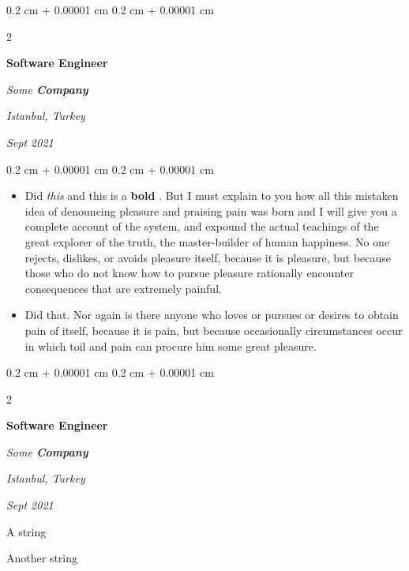 \documentclass[10pt, letterpaper]{article}
\newenvironment{summary}{
    \begin{description}[
        topsep=0.10 cm,
        parsep=0.10 cm,
        partopsep=0pt,
        itemsep=0pt,
        leftmargin=0.4 cm + 10pt
    ]
}{
    \end{description}
} %
\newenvironment{highlights}{
    \begin{itemize}[
        topsep=0.10 cm,
        parsep=0.10 cm,
        partopsep=0pt,
        itemsep=0pt,
        leftmargin=0.4 cm + 10pt
    ]
}{
    \end{itemize}
} %
\newenvironment{onecolentry}{
    \begin{adjustwidth}{
        0.2 cm + 0.00001 cm
    }{
        0.2 cm + 0.00001 cm
    }
}{
    \end{adjustwidth}
} %
\newenvironment{twocolentry}[2][]{
    \onecolentry
    \def\secondColumn{#2}
    \setcolumnwidth{\fill, 4.5 cm}
    \begin{paracol}{2}
}{
    \switchcolumn \raggedleft \secondColumn
    \end{paracol}
    \endonecolentry
} %
\let\hrefWithoutArrow\href
\renewcommand{\href}[2]{\hrefWithoutArrow{#1}{\ifthenelse{\equal{#2}{}}{ }{#2 }\raisebox{.15ex}{\footnotesize \faExternalLink*}}}
\begin{document}
        \vspace{0.2 cm}

        \begin{twocolentry}{
        \textit{Istanbul, Turkey}    
            
        \textit{Sept 2021}}
            \textbf{Software Engineer}
            
            \textit{Some \textbf{Company}}
        \end{twocolentry}
        \vspace{0.10 cm}
        \begin{onecolentry}
            \begin{highlights}
                \item Did \textit{this} and this is a \textbf{bold} \href{https://example.com}{link}. But I must explain to you how all this mistaken idea of denouncing pleasure and praising pain was born and I will give you a complete account of the system, and expound the actual teachings of the great explorer of the truth, the master-builder of human happiness. No one rejects, dislikes, or avoids pleasure itself, because it is pleasure, but because those who do not know how to pursue pleasure rationally encounter consequences that are extremely painful.
                \item Did that. Nor again is there anyone who loves or pursues or desires to obtain pain of itself, because it is pain, but because occasionally circumstances occur in which toil and pain can procure him some great pleasure.
            \end{highlights}
        \end{onecolentry}


        \vspace{0.2 cm}

        \begin{twocolentry}{
        \textit{Istanbul, Turkey}    
            
        \textit{Sept 2021}}
            \textbf{Software Engineer}
            
            \textit{Some \textbf{Company}}
        \end{twocolentry}
            \begin{summary}
                \item A string
                \item Another string
            \end{summary}


        \vspace{0.2 cm}
\end{document}
